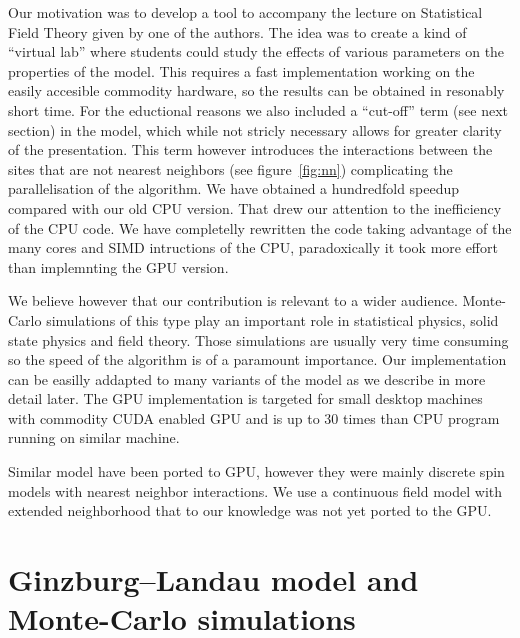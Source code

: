 \documentclass[a4paper]{llncs}
\begin{document}
Our motivation was to develop a tool to accompany the lecture on
Statistical Field Theory given by one of the authors. The idea was to
create a kind of ``virtual lab'' where students could study the
effects of various parameters on the properties of the model. This
requires a fast implementation working on the easily accesible
commodity hardware, so the results can be obtained in resonably short
time. For the eductional reasons we also included a ``cut-off'' term
(see next section) in the model, which while not stricly necessary
allows for greater clarity of the presentation. This term however
introduces the interactions between the sites that are not nearest
neighbors (see figure~\ref{fig:nn}) complicating the parallelisation
of the algorithm.  We have obtained a hundredfold speedup compared
with our old CPU version.  That drew our attention to the inefficiency
of the CPU code. We have completelly rewritten the code taking
advantage of the many cores and SIMD intructions of the CPU,
paradoxically it took more effort than implemnting the GPU version.

We believe however that our contribution is relevant to a wider
audience.  Monte-Carlo simulations of this type play an important role
in statistical physics, solid state physics and field theory.  Those
simulations are usually very time consuming so the speed of the
algorithm is of a paramount importance.  Our implementation can be
easilly addapted to many variants of the model as we describe in more
detail later. The GPU implementation is targeted for small
desktop machines with commodity CUDA enabled GPU and is up to 30 times
than CPU program running on similar machine. 

Similar model have been
ported to GPU, however they were mainly discrete spin models with
nearest neighbor interactions\cite{spin1,spin2,weigel}.  We use a continuous field model
with extended neighborhood that to our knowledge was not yet ported to
the GPU.


\section{Ginzburg--Landau model and Monte-Carlo simulations}
\end{document}
